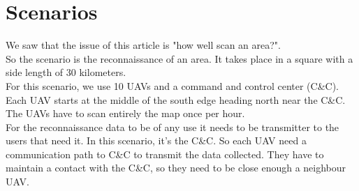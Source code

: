 \chapter{Scenarios}
We saw that the issue of this article is "how well scan an area?".\\ So the scenario is the reconnaissance of an area. It takes place in a square with a side length of 30 kilometers.\\ For this scenario, we use 10 UAVs and a command and control center (C\&C). \\Each UAV starts at the middle of the south edge heading north near the C\&C.
The UAVs have to scan entirely the map once per hour. \\For the reconnaissance data to be of any use it needs to be transmitter to the users that need it. In this scenario, it's the C\&C. So each UAV need a communication path to C\&C to transmit the data collected. They have to maintain a contact with the C\&C, so they need to be close enough a neighbour UAV.
